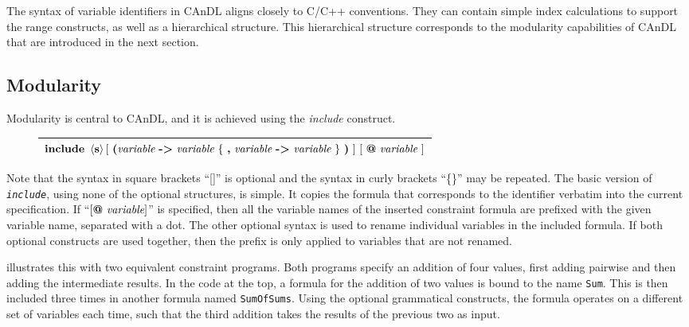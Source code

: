     \noindent
    The syntax of variable identifiers in CAnDL aligns closely to C/C++
    conventions.
    They can contain simple index calculations to support the range constructs,
    as well as a hierarchical structure.
    This hierarchical structure corresponds to the modularity capabilities of
    CAnDL that are introduced in the next section.

\subsection{Modularity}

    Modularity is central to CAnDL, and it is achieved using the {\it include}
    construct.
    \begin{figure}[h]
        \centering
        \begin{tabular}{|c|}
            \hline
            $\text{\bf include}\ \left<\text{\bf s}\right>
                                [\ \text{\bf (}\text{\it variable}\ \text{\bf ->}\ \text{\it variable}\ \{\ \text{\bf ,}\ \text{\it variable}\ \text{\bf ->}\ \text{\it variable}\ \}\ \text{\bf )}\ ]\ 
                                [\ \text{\bf @}\ \text{\it variable}\ ]$\\
            \hline
        \end{tabular}
    \end{figure}

    \noindent
    Note that the syntax in square brackets ``[]'' is optional and the syntax in
    curly brackets ``\{\}'' may be repeated.
    The basic version of \texttt{\it include}, using none of the optional
    structures, is simple.
    It copies the formula that corresponds to the identifier verbatim into
    the current specification.
    If ``$[\text{\bf @}\ \text{\it variable}]$'' is specified, then all the
    variable names of the inserted constraint formula are prefixed with the
    given variable name, separated with a dot.
    The other optional syntax is used to rename individual variables in
    the included formula.
    If both optional constructs are used together, then the prefix is only
    applied to variables that are not renamed.

     illustrates this with two
    equivalent constraint programs.
    Both programs specify an addition of four values, first adding pairwise and
    then adding the intermediate results.
    In the code at the top, a formula for the addition of two values is
    bound to the name {\tt Sum}.
    This is then included three times in another formula named {\tt SumOfSums}.
    Using the optional grammatical constructs, the formula operates on a
    different set of variables each time, such that the third addition
    takes the results of the previous two as input.

